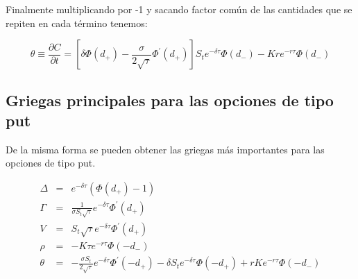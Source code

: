\documentclass[12pt]{article}
\begin{document}
Finalmente multiplicando por -1 y sacando factor com\'{u}n de las cantidades que se repiten en cada t\'{e}rmino tenemos:

\begin{equation}
	\theta \equiv \frac{\partial C}{\partial t} = \left[\delta\Phi\left(d_{+}\right)-\frac{\sigma}{2\sqrt{\tau}}\Phi^{'}
		\left(d_{+}\right)\right]S_{t}e^{-\delta\tau}\Phi\left(d_{-}\right)-Kre^{-r\tau}\Phi\left(d_{-}\right)
\end{equation}

\subsection{Griegas principales para las opciones de tipo put}
De la misma forma se pueden obtener las griegas m\'{a}s importantes para las opciones de tipo put.

\begin{eqnarray*}
	\Delta & = & e^{-\delta\tau}\left(\Phi\left(d_{+}\right)-1\right) \\
	\Gamma & = & \frac{1}{\sigma S_{t}\sqrt{\tau}}e^{-\delta\tau}\Phi^{'}\left(d_{+}\right) \\
	V      & = & S_{t}\sqrt{\tau}e^{-\delta\tau}\Phi^{'}\left(d_{+}\right) \\
	\rho   & = & -K\tau e^{-r\tau}\Phi\left(-d_{-}\right) \\
	\theta & = & -\frac{\sigma S_{t}}{2\sqrt{\tau}}e^{-\delta\tau}\Phi^{'}\left(-d_{+}\right) - \delta S_{t}e^{-\delta\tau}
			\Phi\left(-d_{+}\right) + rKe^{-r\tau}\Phi\left(-d_{-}\right)
\end{eqnarray*}
\end{document}
